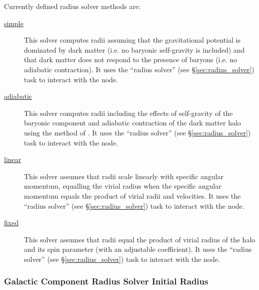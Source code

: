 Currently defined radius solver methods are:
\begin{description}
 \item [\hyperlink{galactic_structure.radius_solver.simple.F90:galactic_structure_radii_simple:galactic_structure_radii_solve_simple}{{\normalfont \ttfamily simple}}] This solver computes radii assuming that the gravitational potential is dominated by dark matter (i.e. no baryonic self-gravity is included) and that dark matter does not respond to the presence of baryons (i.e. no adiabatic contraction). It uses the ``radius solver'' (see \S\ref{sec:radius_solver}) task to interact with the node.
 \item [\hyperlink{galactic_structure.radius_solver.adiabatic.F90:galactic_structure_radii_adiabatic:galactic_structure_radii_solve_adiabatic}{{\normalfont \ttfamily adiabatic}}] This solver computes radii including the effects of self-gravity of the baryonic component and adiabatic contraction of the dark matter halo using the method of \cite{gnedin_response_2004}. It uses the ``radius solver'' (see \S\ref{sec:radius_solver}) task to interact with the node.
 \item [\hyperlink{galactic_structure.radius_solver.linear.F90:galactic_structure_radii_linear:galactic_structure_radii_solve_linear}{{\normalfont \ttfamily linear}}] This solver assumes that radii scale linearly with specific angular momentum, equalling the virial radius when the specific angular momentum equals the product of virial radii and velocities. It uses the ``radius solver'' (see \S\ref{sec:radius_solver}) task to interact with the node.
 \item [\hyperlink{galactic_structure.radius_solver.fixed.F90:galactic_structure_radii_fixed:galactic_structure_radii_solve_fixed}{{\normalfont \ttfamily fixed}}] This solver assumes that radii equal the product of virial radius of the halo and its spin parameter (with an adjustable coefficient). It uses the ``radius solver'' (see \S\ref{sec:radius_solver}) task to interact with the node.
\end{description}

\subsubsection{Galactic Component Radius Solver Initial Radius}

